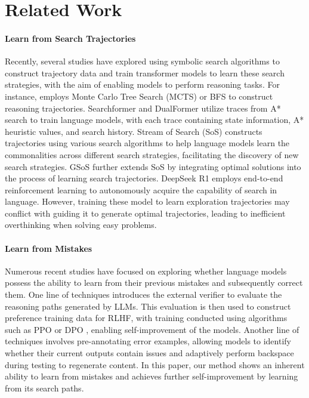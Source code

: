 \section{Related Work}
\paragraph{Learn from Search Trajectories}
Recently, several studies have explored using symbolic search algorithms to construct trajectory data and train transformer models to learn these search strategies, with the aim of enabling models to perform reasoning tasks. For instance, \citet{yang2022chain} employs Monte Carlo Tree Search (MCTS) or BFS to construct reasoning trajectories. Searchformer \cite{searchformer} and DualFormer \cite{dualformer} utilize traces from A* search to train language models, with each trace containing state information, A* heuristic values, and search history. Stream of Search (SoS) \cite{sos} constructs trajectories using various search algorithms to help language models learn the commonalities across different search strategies, facilitating the discovery of new search strategies. GSoS \cite{gsos} further extends SoS by integrating optimal solutions into the process of learning search trajectories.
 DeepSeek R1 \cite{guo2025deepseek} employs end-to-end reinforcement learning to autonomously acquire the capability of search in language. However, training these model to learn exploration trajectories may conflict with guiding it to generate optimal trajectories, leading to inefficient overthinking when solving easy problems.

\paragraph{Learn from Mistakes}
Numerous recent studies have focused on exploring whether language models possess the ability to learn from their previous mistakes and subsequently correct them. One line of techniques \cite{an2023learning,tong2024can,cpo} introduces the external verifier to evaluate the reasoning paths generated by LLMs. This evaluation is then used to construct preference training data for RLHF, with training conducted using algorithms such as PPO \cite{ppo} or DPO \cite{dpo}, enabling self-improvement \cite{yuan2024self} of the models. Another line of techniques \cite{cundy2023sequencematch,zhang2024backtracking,ye2024physics} involves pre-annotating error examples, allowing models to identify whether their current outputs contain issues and adaptively perform backspace during testing to regenerate content. In this paper, our method shows an inherent ability to learn from mistakes and achieves further self-improvement by learning from its search paths.


